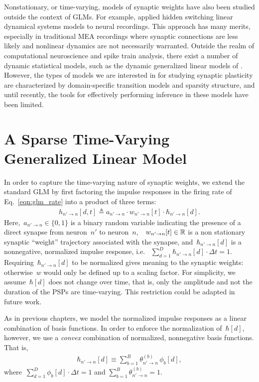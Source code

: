 Nonstationary, or time-varying, models of synaptic weights have also
been studied outside the context of GLMs. For example,
\citet{Petreska-2011} applied hidden switching linear dynamical
systems models to neural recordings. This approach has many merits,
especially in traditional MEA recordings where synaptic connections
are less likely and nonlinear dynamics are not necessarily
warranted. Outside the realm of computational neuroscience and spike
train analysis, there exist a number of dynamic statistical models,
such as the dynamic generalized linear models of \citet{West-1985}.
However, the types of models we are interested in for studying
synaptic plasticity are characterized by domain-specific transition
models and sparsity structure, and until recently, the tools for
effectively performing inference in these models have been limited.


\section{A Sparse Time-Varying Generalized Linear Model}
In order to capture the time-varying nature of synaptic weights, we
extend the standard GLM by first factoring the impulse responses in
the firing rate of Eq.~\ref{eqn:glm_rate} into a product of three
terms:
\begin{align}
\label{eqn:tvwglm_ir}
h_{n' \to n}[d, t] \triangleq a_{n'\to n} \cdot w_{n' \to n}[t] \cdot \hbar_{n' \to n}[d].
\end{align}
Here,~${a_{n'\to n}\in\{0,1\}}$ is a binary random variable indicating
the presence of a direct synapse from neuron~$n'$ to
neuron~$n$,~~${w_{n'\to n}[t] \in \mathbb{R}}$ is a non stationary
synaptic ``weight'' trajectory associated with the synapse, and~$\hbar_{n'
  \to n}[d]$ is a nonnegative, normalized impulse response,
i.e. ~${\sum_{d=1}^D \hbar_{n' \to n}[d] \cdot \Delta t =
  1}$. Requiring~${\hbar_{n' \to n}[d]}$ to be normalized gives
meaning to the synaptic weights: otherwise~$w$ would only be defined
up to a scaling factor. For simplicity, we assume~$\hbar[d]$ does
not change over time, that is, only the amplitude and not the duration
of the PSPs are time-varying. This restriction could be adapted in
future work.

As in previous chapters, we model the normalized impulse responses as
a linear combination of basis functions. In order to enforce the
normalization of~$\hbar[d]$, however, we use a \emph{convex}
combination of normalized, nonnegative basis functions. That is,
\begin{align*}
\hbar_{n' \to n}[d] \equiv \sum_{b=1}^B \theta_{n' \to n}^{(b)}\, \phi_b[d],
\end{align*}
where~${\sum_{d=1}^D \phi_b[d] \cdot \Delta t = 1}$ and
${\sum_{b=1}^B \theta_{n' \to n}^{(b)} = 1}$. 

